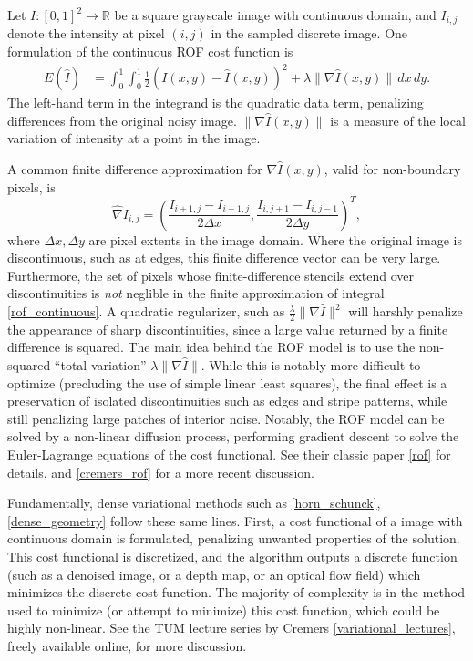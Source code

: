 \documentclass[conference]{IEEEtran}
\begin{document}
Let $I:[0,1]^2 \rightarrow \mathbb{R}$ be a square grayscale image with continuous domain, and
$I_{i,j}$ denote the intensity at pixel $(i, j)$ in the sampled discrete image.
One formulation of the continuous ROF cost function is
\begin{equation}\label{rof_continuous}
\begin{split}
    E(\hat{I}) &= \int_0^1\int_0^1 \frac{1}{2} \left(I(x,y) - \hat{I}(x,y)\right)^2 + \lambda \|\nabla \hat{I}(x,y)\| \,dx \,dy.
\end{split}
\end{equation}
The left-hand term in the integrand is the quadratic data term, penalizing differences from the original noisy image.
$\|\nabla \hat{I}(x,y)\|$ is a measure of the local variation of intensity at a point in the image.

A common finite difference approximation for $\nabla\hat{I}(x,y)$, valid for non-boundary pixels, is
\begin{equation}
    \hat{\nabla}I_{i,j} = \left(\frac{I_{i+1,j} - I_{i-1,j}}{2\Delta x}, \frac{I_{i,j+1} - I_{i,j-1}}{2\Delta y}\right)^T,
\end{equation}
where $\Delta x, \Delta y$ are pixel extents in the image domain. Where the original image is discontinuous, such as at edges,
this finite difference vector can be very large. Furthermore, the set of pixels whose finite-difference stencils extend over discontinuities is
\textit{not} neglible in the finite approximation of integral \eqref{rof_continuous}. A quadratic regularizer, such as
$\frac{\lambda}{2} \|\nabla \hat{I}\|^2$ will harshly penalize the appearance of sharp discontinuities, since a large value returned
by a finite difference is squared. The main idea behind the ROF model is to use the non-squared ``total-variation'' $\lambda \|\nabla \hat{I}\|$.
While this is notably more difficult to optimize (precluding the use of simple linear least squares), the final effect is a preservation
of isolated discontinuities such as edges and stripe patterns, while still penalizing large patches of interior noise. Notably, the ROF model can be solved by a non-linear diffusion process, performing gradient descent to solve the Euler-Lagrange
equations of the cost functional. See their classic paper \ref{rof} for details, and \ref{cremers_rof} for a more recent discussion.

Fundamentally, dense variational methods such as \eqref{horn_schunck}, \eqref{dense_geometry} follow these same lines. First,
a cost functional of a image with continuous domain is formulated, penalizing unwanted properties of the solution. This cost functional is discretized,
and the algorithm outputs a discrete function (such as a denoised image, or a depth map, or an optical flow field) which minimizes the discrete cost function.
The majority of complexity is in the method used to minimize (or attempt to minimize) this cost function, which could be highly non-linear.
See the TUM lecture series by Cremers \ref{variational_lectures}, freely available online, for more discussion.
\end{document}
